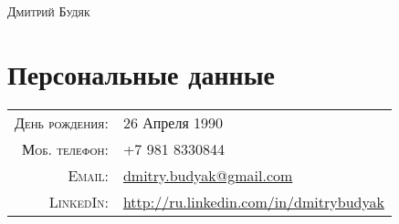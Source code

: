 \documentclass[a4paper,10pt]{article}
\begin{document}
\pagestyle{empty}
\par{\centering
	\Huge \textsc{Дмитрий Будяк}
	}\bigskip\par

\section{Персональные данные}
	\begin{tabular}{rl}
	\textsc{День рождения:} &  26 Апреля 1990 \\
	\textsc{Моб. телефон:}     & +7 981 8330844 \\
	\textsc{Email:}     & \href{mailto:dmitry.budyak@gmail.com}{dmitry.budyak@gmail.com} \\
	\textsc{LinkedIn:} & \href{http://ru.linkedin.com/in/dmitrybudyak}{http://ru.linkedin.com/in/dmitrybudyak}
	\end{tabular}
\end{document}
